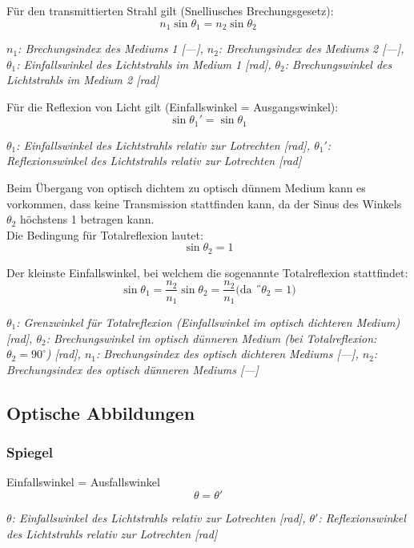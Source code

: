 \documentclass[a4paper,10pt]{article}
\newenvironment{displayformula}
{
	\begin{framed}
		\color{formulaColor}
	}
	{\end{framed}}
\newcommand{\formulalegend}[1]{%
	\par\vspace{0.5ex}%
	{{\color{legendColor}\RaggedRight\small\textit{#1}}}%
	\par\vspace{1.5ex}%
}
\begin{document}
\begin{displayformula}
	Für den transmittierten Strahl gilt (Snelliusches Brechungsgesetz):
	\[
	n_1 \sin \theta_1 = n_2 \sin \theta_2
	\]
\end{displayformula}
\formulalegend{
	\( n_1 \): Brechungsindex des Mediums 1 [—], 
	\( n_2 \): Brechungsindex des Mediums 2 [—], 
	\( \theta_1 \): Einfallswinkel des Lichtstrahls im Medium 1 [rad], 
	\( \theta_2 \): Brechungswinkel des Lichtstrahls im Medium 2 [rad]
}


\begin{displayformula}
	Für die Reflexion von Licht gilt (Einfallswinkel = Ausgangswinkel):
	\[
	\sin \theta_1' = \sin \theta_1
	\]
\end{displayformula}
\formulalegend{
	\( \theta_1 \): Einfallswinkel des Lichtstrahls relativ zur Lotrechten [rad], 
	\( \theta_1' \): Reflexionswinkel des Lichtstrahls relativ zur Lotrechten [rad]
}


\begin{displayformula}
	Beim Übergang von optisch dichtem zu optisch dünnem Medium kann es vorkommen, dass keine Transmission stattfinden kann, da der Sinus des Winkels $\theta_2$ höchstens 1 betragen kann. \\
	Die Bedingung für Totalreflexion lautet:
	\[
	\sin \theta_2 = 1
	\]
	
	Der kleinste Einfallswinkel, bei welchem die sogenannte Totalreflexion stattfindet:
	\[
	\sin \theta_1 = \frac{n_2}{n_1} \sin \theta_2 = \frac{n_2}{n_1} \text{(da $˝\theta_2 = 1$)}
	\]
\end{displayformula}
\formulalegend{
	\( \theta_1 \): Grenzwinkel für Totalreflexion (Einfallswinkel im optisch dichteren Medium) [rad], 
	\( \theta_2 \): Brechungswinkel im optisch dünneren Medium (bei Totalreflexion: \( \theta_2 = 90^\circ \)) [rad], 
	\( n_1 \): Brechungsindex des optisch dichteren Mediums [—], 
	\( n_2 \): Brechungsindex des optisch dünneren Mediums [—]
}


\subsection{Optische Abbildungen}

\subsubsection{Spiegel}
\begin{displayformula}
	Einfallswinkel = Ausfallswinkel
	\[
	\theta = \theta '
	\]
\end{displayformula}
\formulalegend{
	\( \theta \): Einfallswinkel des Lichtstrahls relativ zur Lotrechten [rad], 
	\( \theta' \): Reflexionswinkel des Lichtstrahls relativ zur Lotrechten [rad]
}
\end{document}
